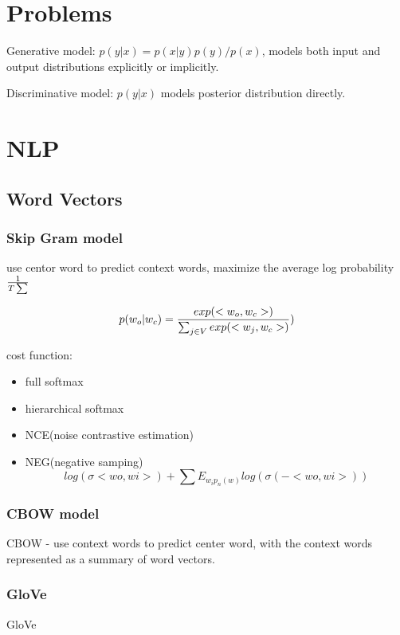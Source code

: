 \documentclass[10pt,a4paper]{book}
\begin{document}
\chapter{Problems}

Generative model: $p(y|x) = p(x|y)p(y)/p(x)$, models both input and output distributions explicitly or implicitly.


Discriminative model: $p(y|x)$
models posterior distribution directly.


\chapter{NLP}

\section{Word Vectors}

\subsection{Skip Gram model}
use centor word to predict context words, maximize the average log probability
$1\over T \sum$

$$ p(w_o | w_c) = {exp(<w_o,w_c>) \over \sum_{j \in V} exp(<w_j,w_c>) })$$

cost function:
\begin{itemize}
	\item full softmax
	\item hierarchical softmax
	\item NCE(noise contrastive estimation)
	\item NEG(negative samping)
	$$log(\sigma <wo,wi>) + \sum E_{w_i  p_n(w)} {log(\sigma (- <wo,wi>))}$$
\end{itemize}


\subsection{CBOW model}

CBOW - use context words to predict center word, with the context words represented as a summary of word vectors.

\subsection{GloVe}
GloVe
\end{document}
